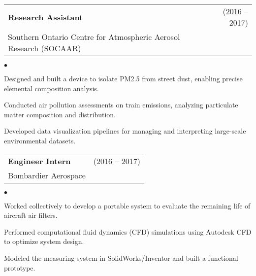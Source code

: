 \documentclass[a4paper,20pt]{article}
\makeatletter
\newcommand{\resumeTechHeading}[4]{%
  \vspace{0pt}%
  \begin{tabular*}{1.00\textwidth}{l@{\extracolsep{\fill}}r}
    #1 & #2 \\
    #3 & \textit{#4} \\
  \end{tabular*}%
  \vspace{1pt}%
}
\newenvironment{resumeTechItems}{%
  \begingroup
  \fontsize{10pt}{12pt}\selectfont   %
  \setlength{\parskip}{0pt}          %
  \setlength{\baselineskip}{12pt}    %
  \begin{list}{$\bullet$}{           %
    \setlength{\leftmargin}{1.3em}   %
    \setlength{\rightmargin}{0.2em}  %
    \setlength{\itemsep}{-2pt}       %
    \setlength{\topsep}{1pt}         %
    \setlength{\parsep}{2pt}         %
  }
}
{
  \end{list}%
  \endgroup %
}
\makeatother
\begin{document}
\resumeTechHeading{\textbf{Research Assistant}}{(2016 – 2017)}
{Southern Ontario Centre for Atmospheric Aerosol Research (SOCAAR)}{}

\begin{resumeTechItems}
  \item{Designed and built a device to isolate PM2.5 from street dust, enabling precise elemental composition analysis.}
  \item{Conducted air pollution assessments on train emissions, analyzing particulate matter composition and distribution.}
  \item{Developed data visualization pipelines for managing and interpreting large-scale environmental datasets.}
\end{resumeTechItems}


\resumeTechHeading{\textbf{Engineer Intern}}{(2016 – 2017)}
{Bombardier Aerospace}{}

\begin{resumeTechItems}
  \item{Worked collectively to develop a portable system to evaluate the remaining life of aircraft air filters.}
  \item{Performed computational fluid dynamics (CFD) simulations using Autodesk CFD to optimize system design.}
  \item{Modeled the measuring system in SolidWorks/Inventor and built a functional prototype.}
\end{resumeTechItems}
\end{document}
